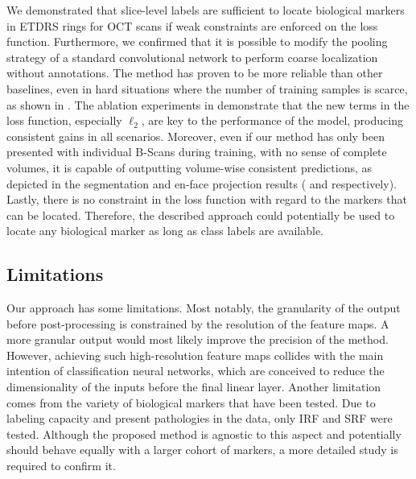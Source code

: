 We demonstrated that slice-level labels are sufficient to locate biological markers in ETDRS rings for OCT scans if weak constraints are enforced on the loss function. Furthermore, we confirmed that it is possible to modify the pooling strategy of a standard convolutional network to perform coarse localization without annotations. The method has proven to be more reliable than other baselines, even in hard situations where the number of training samples is scarce, as shown in . The ablation experiments in  demonstrate that the new terms in the loss function, especially $\ell_2$, are key to the performance of the model, producing consistent gains in all scenarios. Moreover, even if our method has only been presented with individual B-Scans during training, with no sense of complete volumes, it is capable of outputting volume-wise consistent predictions, as depicted in the segmentation and en-face projection results ( and  respectively). Lastly, there is no constraint in the loss function with regard to the markers that can be located. Therefore, the described approach could potentially be used to locate any biological marker as long as class labels are available.

\subsection{Limitations}
Our approach has some limitations. Most notably, the granularity of the output before post-processing is constrained by the resolution of the feature maps. A more granular output would most likely improve the precision of the method. However, achieving such high-resolution feature maps collides with the main intention of classification neural networks, which are conceived to reduce the dimensionality of the inputs before the final linear layer. Another limitation comes from the variety of biological markers that have been tested. Due to labeling capacity and present pathologies in the data, only IRF and SRF were tested. Although the proposed method is agnostic to this aspect and potentially should behave equally with a larger cohort of markers, a more detailed study is required to confirm it.
